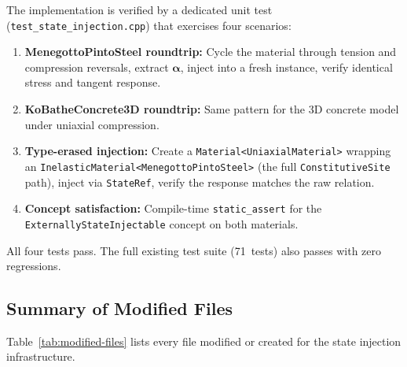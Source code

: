 The implementation is verified by a dedicated unit test
(\texttt{test\_state\_injection.cpp}) that exercises four scenarios:

\begin{enumerate}
  \item \textbf{MenegottoPintoSteel roundtrip:}  Cycle the material
    through tension and compression reversals, extract
    $\boldsymbol{\alpha}$, inject into a fresh instance, verify
    identical stress and tangent response.
  \item \textbf{KoBatheConcrete3D roundtrip:}  Same pattern for the
    3D concrete model under uniaxial compression.
  \item \textbf{Type-erased injection:}  Create a
    \texttt{Material<UniaxialMaterial>} wrapping an
    \texttt{InelasticMaterial<MenegottoPintoSteel>} (the full
    \texttt{ConstitutiveSite} path), inject via
    \texttt{StateRef}, verify the response matches the raw
    relation.
  \item \textbf{Concept satisfaction:}  Compile-time
    \texttt{static\_assert} for the \texttt{ExternallyStateInjectable}
    concept on both materials.
\end{enumerate}

All four tests pass.  The full existing test suite (71~tests) also
passes with zero regressions.


\subsection{Summary of Modified Files}
\label{ssec:modified-files}

Table~\ref{tab:modified-files} lists every file modified or created
for the state injection infrastructure.

